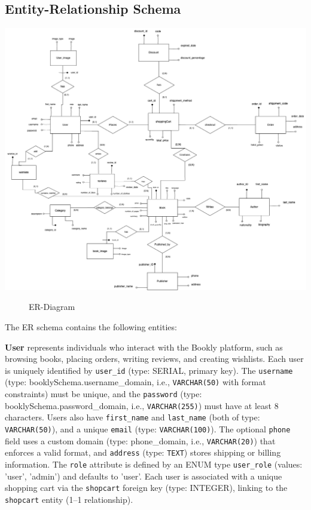 \subsection{Entity-Relationship Schema}

\includegraphics[width=0.8\linewidth]{HW1Report/photos/finalBookly.png}

\begin{figure}[h!]
    \centering
    \caption{ER-Diagram}
    \label{fig:enter-label}
\end{figure}

The ER schema contains the following entities:


\textbf{User} represents individuals who interact with the Bookly platform, such as browsing books, placing orders, writing reviews, and creating wishlists. Each user is uniquely identified by \texttt{user\_id} (type: SERIAL, primary key). The \texttt{username} (type: booklySchema.username\_domain, i.e., \texttt{VARCHAR(50)} with format constraints) must be unique, and the \texttt{password} (type: booklySchema.password\_domain, i.e., \texttt{VARCHAR(255)}) must have at least 8 characters. Users also have \texttt{first\_name} and \texttt{last\_name} (both of type: \texttt{VARCHAR(50)}), and a unique \texttt{email} (type: \texttt{VARCHAR(100)}). The optional \texttt{phone} field uses a custom domain (type: phone\_domain, i.e., \texttt{VARCHAR(20)}) that enforces a valid format, and \texttt{address} (type: \texttt{TEXT}) stores shipping or billing information. The \texttt{role} attribute is defined by an ENUM type \texttt{user\_role} (values: 'user', 'admin') and defaults to 'user'. Each user is associated with a unique shopping cart via the \texttt{shopcart} foreign key (type: INTEGER), linking to the \texttt{shopcart} entity (1–1 relationship).\\

